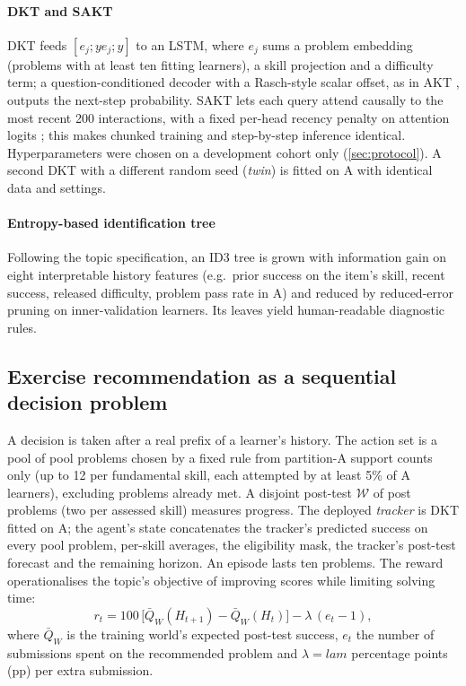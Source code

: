 \paragraph{DKT and SAKT} DKT \citep{piech2015dkt} feeds $[e_j; y e_j; y]$ to an LSTM, where $e_j$ sums a problem embedding (problems with at least ten fitting learners), a skill projection and a difficulty term; a question-conditioned decoder with a Rasch-style scalar offset, as in AKT \citep{ghosh2020akt}, outputs the next-step probability. SAKT \citep{pandey2019sakt} lets each query attend causally to the most recent 200 interactions, with a fixed per-head recency penalty on attention logits \citep{press2022alibi}; this makes chunked training and step-by-step inference identical. Hyperparameters were chosen on a development cohort only (\cref{sec:protocol}). A second DKT with a different random seed (\emph{twin}) is fitted on A with identical data and settings.

\paragraph{Entropy-based identification tree} Following the topic specification, an ID3 tree \citep{quinlan1986id3} is grown with information gain on eight interpretable history features (e.g.\ prior success on the item's skill, recent success, released difficulty, problem pass rate in A) and reduced by reduced-error pruning on inner-validation learners. Its leaves yield human-readable diagnostic rules.

\subsection{Exercise recommendation as a sequential decision problem}\label{sec:mdp}

A decision is taken after a real prefix of a learner's history. The action set is a pool of {{pool}} problems chosen by a fixed rule from partition-A support counts only (up to 12 per fundamental skill, each attempted by at least 5\% of A learners), excluding problems already met. A disjoint post-test $\mathcal W$ of {{post}} problems (two per assessed skill) measures progress. The deployed \emph{tracker} is DKT fitted on A; the agent's state concatenates the tracker's predicted success on every pool problem, per-skill averages, the eligibility mask, the tracker's post-test forecast and the remaining horizon. An episode lasts ten problems. The reward operationalises the topic's objective of improving scores while limiting solving time:
\begin{equation}
r_t = 100\,\bigl[\bar Q_W(H_{t+1}) - \bar Q_W(H_t)\bigr] - \lambda\,(e_t-1),
\label{eq:reward}
\end{equation}
where $\bar Q_W$ is the training world's expected post-test success, $e_t$ the number of submissions spent on the recommended problem and $\lambda={{lam}}$ percentage points (pp) per extra submission.

